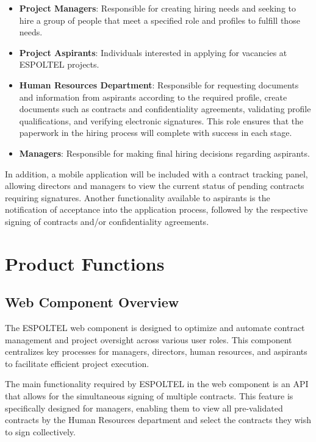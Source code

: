 \documentclass{scrreprt}
\begin{document}
\begin{itemize}
    \item \textbf{Project Managers}: Responsible for creating hiring needs and seeking to hire a group of people that meet a specified role and profiles to fulfill those needs.
    \item \textbf{Project Aspirants}: Individuals interested in applying for vacancies at ESPOLTEL projects.
    \item \textbf{Human Resources Department}: Responsible for requesting documents and information from aspirants according to the required profile, create documents such as contracts and confidentiality agreements, validating profile qualifications, and verifying electronic signatures. This role ensures that the paperwork in the hiring process will complete with success in each stage.
    \item \textbf{Managers}: Responsible for making final hiring decisions regarding aspirants.
\end{itemize}

In addition, a mobile application will be included with a contract tracking panel, allowing directors and managers to view the current status of pending contracts requiring signatures. Another functionality available to aspirants is the notification of acceptance into the application process, followed by the respective signing of contracts and/or confidentiality agreements.




\section{Product Functions}
\subsection{Web Component Overview}

The ESPOLTEL web component is designed to optimize and automate contract management and project oversight across various user roles. This component centralizes key processes for managers, directors, human resources, and aspirants to facilitate efficient project execution.

The main functionality required by ESPOLTEL in the web component is an API that allows for the simultaneous signing of multiple contracts. This feature is specifically designed for managers, enabling them to view all pre-validated contracts by the Human Resources department and select the contracts they wish to sign collectively.
\end{document}

